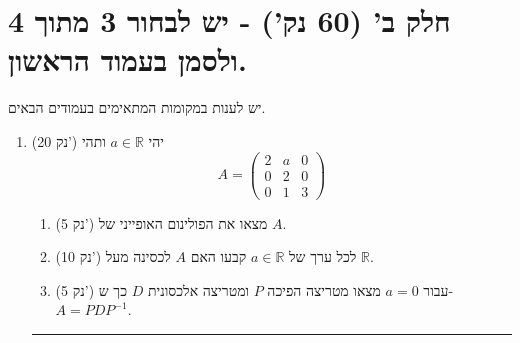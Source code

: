 \documentclass[12pt, a4paper]{article}
\newcommand{\rr}{\mathbb{R}}
\newcommand{\points}[1]{(#1 נק') }
\begin{document}
 \pagebreak

\section*{חלק ב' (60 נק') - יש לבחור 3 מתוך 4 ולסמן בעמוד הראשון.}
יש לענות במקומות המתאימים בעמודים הבאים.
\begin{enumerate}
\newcommand{\firstQ}{
\item\points{20}
יהי
$a\in\rr$
ותהי
$$A=
\begin{pmatrix}
2&a&0\\
0&2&0\\
0&1&3
\end{pmatrix}$$
\begin{enumerate}
\item\points{5}
מצאו את הפולינום האופייני של
$A$.

\item\points{10}
לכל ערך של
$a\in\rr$
קבעו האם
$A$
לכסינה מעל
$\rr$.

\item\points{5}
עבור
$a=0$
מצאו מטריצה הפיכה
$P$
ומטריצה אלכסונית
$D$
כך ש-
$A=PDP^{-1}$.
\end{enumerate}
}
\firstQ
\noindent\rule{\textwidth-30pt}{0.4pt}

\newcommand{\secondQ}{

\item\points{20}
נסמן
$$B=\left\{
\begin{pmatrix}
1\\
1\\
0
\end{pmatrix},
\begin{pmatrix}
1\\
0\\
1
\end{pmatrix},
\begin{pmatrix}
0\\
1\\
1
\end{pmatrix}
\right\}$$
תהי
$T:\rr^3\to\rr^3$
העתקה לינארית המקיימת
$$T\begin{pmatrix}
1\\
1\\
0
\end{pmatrix}
=
\begin{pmatrix}
3\\
2\\
2
\end{pmatrix},
\qquad
T\begin{pmatrix}
1\\
0\\
1
\end{pmatrix}
=
\begin{pmatrix}
2\\
1\\
2
\end{pmatrix},
\qquad
T\begin{pmatrix}
0\\
1\\
1
\end{pmatrix}
=
\begin{pmatrix}
3\\
1\\
4
\end{pmatrix}$$

}
\end{enumerate}
\end{document}
